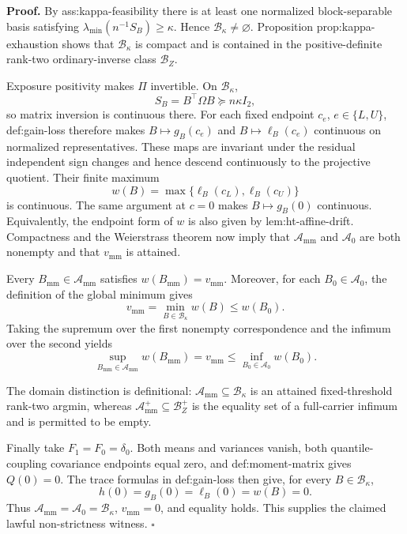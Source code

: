 \textbf{Proof.}
By ass:kappa-feasibility there is at least one normalized block-separable basis satisfying \(\lambda_{\min}(n^{-1}S_B)\ge\kappa\).  Hence \(\mathcal B_\kappa\ne\varnothing\).  Proposition prop:kappa-exhaustion shows that \(\mathcal B_\kappa\) is compact and is contained in the positive-definite rank-two ordinary-inverse class \(\mathcal B_Z\).

Exposure positivity makes \(\Pi\) invertible.  On \(\mathcal B_\kappa\),
\[
S_B=B^{\top}\Omega B\succeq n\kappa I_2,
\]
so matrix inversion is continuous there.  For each fixed endpoint \(c_e\), \(e\in\{L,U\}\), def:gain-loss therefore makes \(B\mapsto g_B(c_e)\) and \(B\mapsto\ell_B(c_e)\) continuous on normalized representatives.  These maps are invariant under the residual independent sign changes and hence descend continuously to the projective quotient.  Their finite maximum
\[
w(B)=\max\{\ell_B(c_L),\ell_B(c_U)\}
\]
is continuous.  The same argument at \(c=0\) makes \(B\mapsto g_B(0)\) continuous.  Equivalently, the endpoint form of \(w\) is also given by lem:ht-affine-drift.  Compactness and the Weierstrass theorem now imply that \(\mathcal A_{\mathrm{mm}}\) and \(\mathcal A_0\) are both nonempty and that \(v_{\mathrm{mm}}\) is attained.

Every \(B_{\mathrm{mm}}\in\mathcal A_{\mathrm{mm}}\) satisfies \(w(B_{\mathrm{mm}})=v_{\mathrm{mm}}\).  Moreover, for each \(B_0\in\mathcal A_0\), the definition of the global minimum gives
\[
v_{\mathrm{mm}}=\min_{B\in\mathcal B_\kappa}w(B)\le w(B_0).
\]
Taking the supremum over the first nonempty correspondence and the infimum over the second yields
\[
\sup_{B_{\mathrm{mm}}\in\mathcal A_{\mathrm{mm}}}w(B_{\mathrm{mm}})
=v_{\mathrm{mm}}
\le
\inf_{B_0\in\mathcal A_0}w(B_0).
\]

The domain distinction is definitional: \(\mathcal A_{\mathrm{mm}}\subseteq\mathcal B_\kappa\) is an attained fixed-threshold rank-two argmin, whereas \(\mathcal A_{\mathrm{mm}}^+\subseteq\mathcal B_Z^+\) is the equality set of a full-carrier infimum and is permitted to be empty.

Finally take \(F_1=F_0=\delta_0\).  Both means and variances vanish, both quantile-coupling covariance endpoints equal zero, and def:moment-matrix gives \(Q(0)=0\).  The trace formulas in def:gain-loss then give, for every \(B\in\mathcal B_\kappa\),
\[
h(0)=g_B(0)=\ell_B(0)=w(B)=0.
\]
Thus \(\mathcal A_{\mathrm{mm}}=\mathcal A_0=\mathcal B_\kappa\), \(v_{\mathrm{mm}}=0\), and equality holds.  This supplies the claimed lawful non-strictness witness. \(\square\)